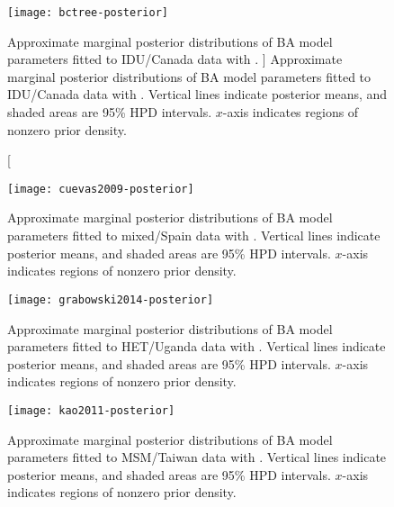 \clearpage

\begin{figure}[ht]
    \texttt{[image: bctree-posterior]}
    \caption
    [
        Approximate marginal posterior distributions of \gls{BA} model
        parameters fitted to IDU/Canada data with .
    ]{
        Approximate marginal posterior distributions of \gls{BA} model
        parameters fitted to IDU/Canada data with . Vertical
        lines indicate posterior means, and shaded areas are 95\% \gls{HPD}
        intervals. $x$-axis indicates regions of nonzero prior density.
    }
    \label{fig:bctree}
\end{figure}

\begin{figure}[ht]
    \texttt{[image: cuevas2009-posterior]}
    \caption[
        Approximate marginal posterior distributions of \gls{BA} model
        parameters fitted to mixed/Spain data with .
    ]{
        Approximate marginal posterior distributions of \gls{BA} model
        parameters fitted to mixed/Spain data with . Vertical
        lines indicate posterior means, and shaded areas are 95\% \gls{HPD}
        intervals. $x$-axis indicates regions of nonzero prior density.
    }
    \label{fig:cuevas}
\end{figure}

\begin{figure}[ht]
    \texttt{[image: grabowski2014-posterior]}
    \caption[
        Approximate marginal posterior distributions of \gls{BA} model
        parameters fitted to HET/Uganda data with .
    ]{
        Approximate marginal posterior distributions of \gls{BA} model
        parameters fitted to HET/Uganda data with . Vertical
        lines indicate posterior means, and shaded areas are 95\% \gls{HPD}
        intervals. $x$-axis indicates regions of nonzero prior density.
    }
    \label{fig:grabowski}
\end{figure}

\begin{figure}[ht]
    \texttt{[image: kao2011-posterior]}
    \caption[
        Approximate marginal posterior distributions of \gls{BA} model
        parameters fitted to MSM/Taiwan data with .
    ]{
        Approximate marginal posterior distributions of \gls{BA} model
        parameters fitted to MSM/Taiwan data with . Vertical
        lines indicate posterior means, and shaded areas are 95\% \gls{HPD}
        intervals. $x$-axis indicates regions of nonzero prior density.
    }
    \label{fig:kao}
\end{figure}

